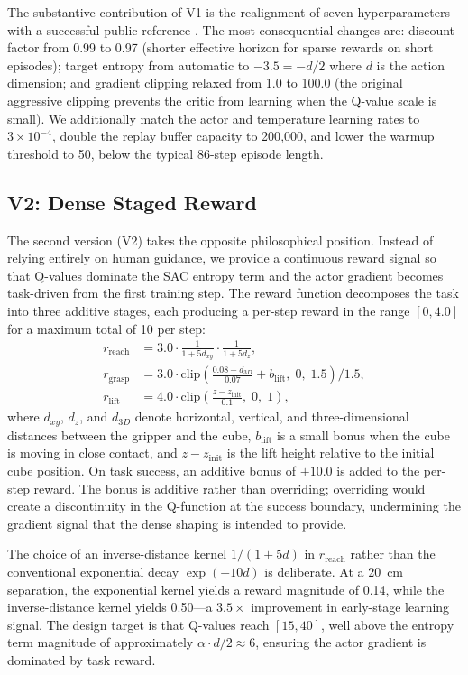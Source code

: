 \documentclass[12pt,a4paper]{article}
\begin{document}
The substantive contribution of V1 is the realignment of seven hyperparameters with a successful public reference \citep{wang2024hilserlsim}. The most consequential changes are: discount factor from 0.99 to 0.97 (shorter effective horizon for sparse rewards on short episodes); target entropy from automatic to $-3.5 = -d/2$ where $d$ is the action dimension; and gradient clipping relaxed from 1.0 to 100.0 (the original aggressive clipping prevents the critic from learning when the Q-value scale is small). We additionally match the actor and temperature learning rates to $3 \times 10^{-4}$, double the replay buffer capacity to 200{,}000, and lower the warmup threshold to 50, below the typical 86-step episode length.

\subsection{V2: Dense Staged Reward}

The second version (V2) takes the opposite philosophical position. Instead of relying entirely on human guidance, we provide a continuous reward signal so that Q-values dominate the SAC entropy term and the actor gradient becomes task-driven from the first training step. The reward function decomposes the task into three additive stages, each producing a per-step reward in the range $[0, 4.0]$ for a maximum total of 10 per step:
\begin{align}
r_{\mathrm{reach}} &= 3.0 \cdot \frac{1}{1 + 5 d_{xy}} \cdot \frac{1}{1 + 5 d_z}, \\
r_{\mathrm{grasp}} &= 3.0 \cdot \mathrm{clip}\!\left( \frac{0.08 - d_{3D}}{0.07} + b_{\mathrm{lift}},\; 0,\; 1.5 \right) / 1.5, \\
r_{\mathrm{lift}}  &= 4.0 \cdot \mathrm{clip}\!\left( \frac{z - z_{\mathrm{init}}}{0.1},\; 0,\; 1 \right),
\end{align}
where $d_{xy}$, $d_z$, and $d_{3D}$ denote horizontal, vertical, and three-dimensional distances between the gripper and the cube, $b_{\mathrm{lift}}$ is a small bonus when the cube is moving in close contact, and $z - z_{\mathrm{init}}$ is the lift height relative to the initial cube position. On task success, an additive bonus of $+10.0$ is added to the per-step reward. The bonus is additive rather than overriding; overriding would create a discontinuity in the Q-function at the success boundary, undermining the gradient signal that the dense shaping is intended to provide.

The choice of an inverse-distance kernel $1/(1 + 5d)$ in $r_{\mathrm{reach}}$ rather than the conventional exponential decay $\exp(-10d)$ is deliberate. At a 20~cm separation, the exponential kernel yields a reward magnitude of 0.14, while the inverse-distance kernel yields 0.50---a $3.5\times$ improvement in early-stage learning signal. The design target is that Q-values reach $[15, 40]$, well above the entropy term magnitude of approximately $\alpha \cdot d / 2 \approx 6$, ensuring the actor gradient is dominated by task reward.
\end{document}
